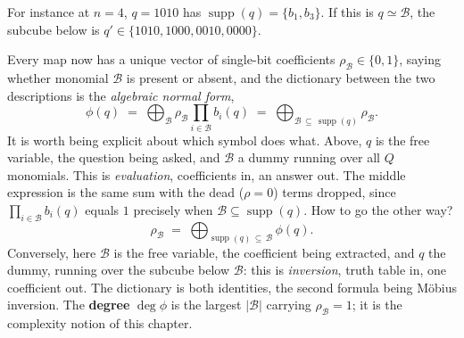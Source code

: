 \documentclass[11pt]{article}
\begin{document}
\begin{example}
  For instance at $n=4$, $q=1010$ has $\operatorname{supp}(q) = \{b_1, b_3\}$. If this is $q\simeq \mathcal{B}$,
  the subcube below is $q'\in \{1010, 1000, 0010, 0000\}$.
\end{example}

Every map now has a unique vector of single-bit coefficients
$\rho_{\mathcal B} \in \{0,1\}$, saying whether monomial $\mathcal B$
is present or absent, and the dictionary between the two descriptions
is the \emph{algebraic normal form},
%
\begin{equation}
  \phi(q) \;=\; \bigoplus_{\mathcal B} \rho_{\mathcal B}
                \prod_{i \in \mathcal B} b_i(q)
          \;=\; \bigoplus_{\mathcal B \,\subseteq\,
                           \operatorname{supp}(q)} \rho_{\mathcal B}.
  \label{eq:anf}
\end{equation}
%
It is worth being explicit about which symbol does what. Above,
$q$ is the free variable, the question being asked, and $\mathcal B$ a
dummy running over all $Q$ monomials. This is \emph{evaluation},
coefficients in, an answer out. The middle expression is the same sum
with the dead ($\rho=0$) terms dropped, since $\prod_{i \in \mathcal B} b_i(q)$
equals $1$ precisely when $\mathcal B \subseteq \operatorname{supp}(q)$. How to go the other way?
%
\begin{equation}
  \rho_{\mathcal B} \;=\;
    \bigoplus_{\operatorname{supp}(q) \,\subseteq\, \mathcal B}
    \phi(q) .
\end{equation}
%
Conversely, here $\mathcal B$ is the free variable, the coefficient being
extracted, and $q$ the dummy, running over the subcube below
$\mathcal B$: this is \emph{inversion}, truth table in, one coefficient
out. The dictionary is both identities, the second formula being M\"obius inversion. The
\textbf{degree} $\deg\phi$ is the largest $|\mathcal B|$ carrying
$\rho_{\mathcal B} = 1$; it is the complexity notion of this chapter.
\end{document}
